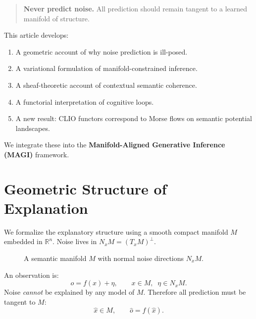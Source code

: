\documentclass[11pt,a4paper,twocolumn]{article}
\begin{document}
\begin{quote}
\textbf{Never predict noise.}  
All prediction should remain tangent to a learned manifold of structure.
\end{quote}

This article develops:
\begin{enumerate}
\item A geometric account of why noise prediction is ill-posed.
\item A variational formulation of manifold-constrained inference.
\item A sheaf-theoretic account of contextual semantic coherence.
\item A functorial interpretation of cognitive loops.
\item A new result: CLIO functors correspond to Morse flows 
      on semantic potential landscapes.
\end{enumerate}

We integrate these into the 
\textbf{Manifold-Aligned Generative Inference (MAGI)} framework.

\section{Geometric Structure of Explanation}

We formalize the explanatory structure using 
a smooth compact manifold $M$ embedded in $\mathbb{R}^n$.
Noise lives in $N_x M = (T_x M)^\perp$.

\begin{figure}[H]
\centering
{}
\caption{A semantic manifold $M$ with normal noise directions $N_xM$.}
\end{figure}

An observation is:
\[
o = f(x) + \eta,\qquad 
x\in M,\;\;\eta\in N_xM.
\]
Noise \emph{cannot} be explained by any model of $M$.
Therefore all prediction must be tangent to $M$:
\[
\hat x \in M,\qquad
\hat o = f(\hat x).
\]
\end{document}
